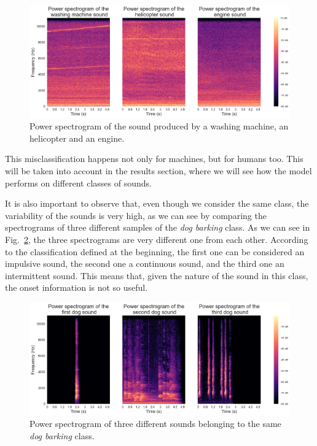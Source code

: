 \documentclass{article}
\begin{document}
\begin{sloppy}
\begin{figure}[ht]
  \centering
  \centerline{\includegraphics[width=\columnwidth]{Ambiguous_sounds.png}}
  \caption{Power spectrogram of the sound produced by a washing machine, an helicopter and an engine.}
  \label{fig:Ambiguous_sounds}
\end{figure}
This misclassification happens not only for machines, but for humans too. This will be taken into account in the results section, where we will see how the model performs on different classes of sounds.

It is also important to observe that, even though we consider the same class, the variability of the sounds is very high, as we can see by comparing the spectrograms of three different
samples of the \textit{dog barking} class. As we can see in Fig.~\ref{fig:Dog_barking}, the three spectrograms are very different one from each other. According to the classification defined at the beginning,
the first one can be considered an impulsive sound, the second one a continuous sound, and the third one an intermittent sound. This means that, given the nature of the sound in this class,
the onset information is not so useful.

\begin{figure}[ht]
  \centering
  \centerline{\includegraphics[width=\columnwidth]{dog_barking.png}}
  \caption{Power spectrogram of three different sounds belonging to the same \textit{dog barking} class.}
  \label{fig:Dog_barking}
\end{figure}


\end{sloppy}
\end{document}
